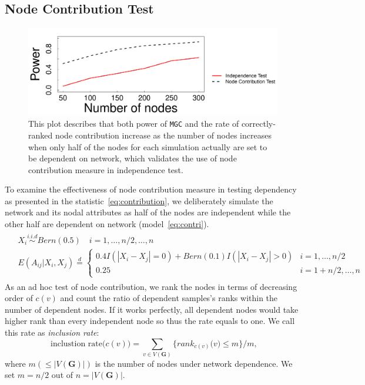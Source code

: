 \documentclass[11pt]{article}
\theoremstyle{definition}
\begin{document}
\subsection{Node Contribution Test}
\label{ssec:node}
\begin{figure}[ht]
	\centering
	\includegraphics[width=0.7\linewidth]{../Figure/nodecontri.pdf}
	\caption{This plot describes that both power of \texttt{MGC} and the rate of correctly-ranked node contribution increase as the number of nodes increases when only half of the nodes for each simulation actually are set to be dependent on network, which validates the use of node contribution measure in independence test.}
	\label{fig:contribution}
\end{figure}
To examine the effectiveness of node contribution measure in testing dependency as presented in the statistic~\ref{eq:contribution}, we deliberately simulate the network and its nodal attributes as half of the nodes are independent while the other half are dependent on network (model~\ref{eq:contri}). 
\begin{equation}
\begin{gathered}
\begin{aligned}
	& X_{i} \overset{i.i.d}{\sim}  Bern(0.5)  \quad i = 1, \ldots ,n/2, \ldots, n \\
	& E( A_{ij} | X_{i}, X_{j} )   \stackrel{d}{=} \left\{  \begin{array}{cc} 0.4 I(|X_{i} - X_{j}| = 0)  + Bern(0.1) I(|X_{i} - X_{j}| > 0) & i = 1,\ldots,n/2 \\   0.25  & i=1+n/2, \ldots, n  \end{array} \right.
	\end{aligned}
	\end{gathered}
\label{eq:contri}
\end{equation}
As an ad hoc test of node contribution, we rank the nodes in terms of decreasing order of $c(v)$ and count the ratio of dependent samples's ranks within the number of dependent nodes. If it works perfectly, all dependent nodes would take higher rank than every independent node so thus the rate equals to one. We call this rate as \textit{inclusion rate}:
\begin{equation}
\mbox{ inclustion rate}\big(  c(v) \big) = \sum\limits_{v \in V(\mathbf{G})} \big\{  rank_{c(v)}\big(  v \big)  \leq  m  \big\}   /  m,
\label{eq:inclusion_rate}
\end{equation}
where $m (\leq |V(\mathbf{G})|)$ is the number of nodes under network dependence. We set $m=n/2$ out of $n = |V(\mathbf{G})|$.
\end{document}
